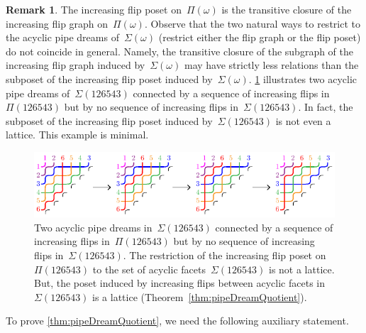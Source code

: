 \documentclass[reqno]{amsart}
\theoremstyle{definition}
\newtheorem{remark}[theorem]{Remark}
\newcommand{\pipeDreams}{\Pi} %
\newcommand{\acyclicPipeDreams}{\Sigma} %
\begin{document}
\begin{remark}
\label{rem:acyclicIncreasingFlipPosetNotLattice}
The increasing flip poset on~$\pipeDreams(\omega)$ is the transitive closure of the increasing flip graph on~$\pipeDreams(\omega)$.
Observe that the two natural ways to restrict to the acyclic pipe dreams of~$\acyclicPipeDreams(\omega)$ (restrict either the flip graph or the flip poset) do not coincide in general.
Namely, the transitive closure of the subgraph of the increasing flip graph induced by~$\acyclicPipeDreams(\omega)$ may have strictly less relations than the subposet of the increasing flip poset induced by~$\acyclicPipeDreams(\omega)$.
\cref{fig:counterExampleRestrictionIncreasingFlipPoset} illustrates two acyclic pipe dreams of~$\acyclicPipeDreams(126543)$ connected by a sequence of increasing flips in~$\pipeDreams(126543)$ but by no sequence of increasing flips in~$\acyclicPipeDreams(126543)$.
In fact, the subposet of the increasing flip poset induced by~$\acyclicPipeDreams(126543)$ is not even a lattice.
This example is minimal.

\begin{figure}[ht]
	\centerline{\includegraphics[scale=1.2]{counterExampleRestrictionIncreasingFlipPoset}}
	\caption{Two acyclic pipe dreams in~$\acyclicPipeDreams(126543)$ connected by a sequence of increasing flips in~$\pipeDreams(126543)$ but by no sequence of increasing flips in~$\acyclicPipeDreams(126543)$.
	The restriction of the increasing flip poset on~$\pipeDreams(126543)$ to the set of acyclic facets~$\acyclicPipeDreams(126543)$ is not a lattice. But, the poset induced by increasing flips between acyclic facets in~$\acyclicPipeDreams(126543)$ is a lattice (Theorem~\ref{thm:pipeDreamQuotient}).}
	\label{fig:counterExampleRestrictionIncreasingFlipPoset}
\end{figure}
\end{remark}

To prove \cref{thm:pipeDreamQuotient}, we need the following auxiliary statement.
\end{document}
